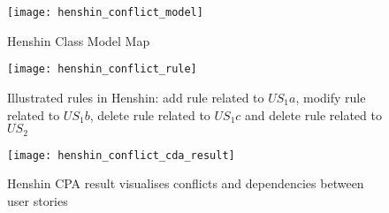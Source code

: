 \begin{example}
\begin{figure}[h]
\center
\texttt{[image: henshin\_conflict\_model]}
\caption{Henshin Class Model Map}\label{fig:conflict_model}
\end{figure}
\begin{figure}[h]
\center
\texttt{[image: henshin\_conflict\_rule]}
\caption{Illustrated rules in Henshin: add rule related to $US_1a$, modify rule related to $US_1b$, delete rule related to $US_1c$  and delete rule related to $US_2$ }\label{fig:conflict_rule}
\end{figure}
\begin{figure}[h]
\center
\texttt{[image: henshin\_conflict\_cda\_result]}
\caption{Henshin CPA result visualises conflicts and dependencies between user stories}\label{fig:conflict_cda}
\end{figure}
\end{example}




